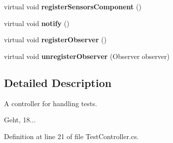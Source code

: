 \begin{DoxyCompactItemize}
\item 
virtual void {\bfseries register\-Sensors\-Component} ()\label{class_editor_1_1_controller_1_1_test_controller_1_1_test_controller_abe4cc2f579ad059245b1f4af84bd9bce}

\item 
virtual void {\bfseries notify} ()\label{class_editor_1_1_controller_1_1_test_controller_1_1_test_controller_a159f3eb6809fab40b90855e887086673}

\item 
virtual void {\bfseries register\-Observer} ()\label{class_editor_1_1_controller_1_1_test_controller_1_1_test_controller_a1789624c34ababf998d61b4dc05c7387}

\item 
virtual void {\bfseries unregister\-Observer} (Observer observer)\label{class_editor_1_1_controller_1_1_test_controller_1_1_test_controller_a6bf6ea1d274040e3f014fca67b4221d4}

\end{DoxyCompactItemize}


\subsection{Detailed Description}
A controller for handling tests. 

Geht, 18... 

Definition at line 21 of file Test\-Controller.\-cs.

